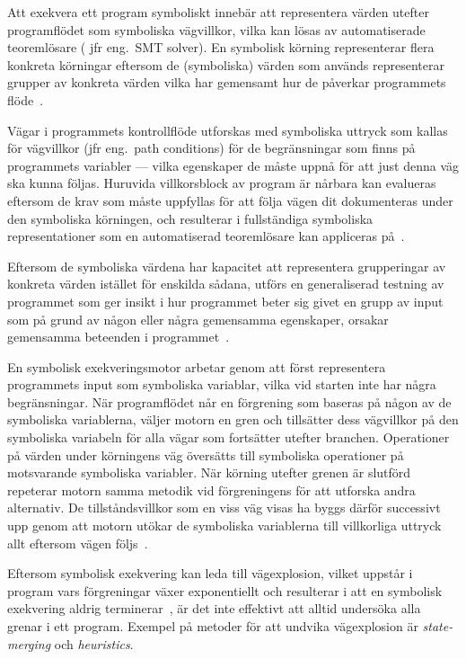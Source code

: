 Att exekvera ett program symboliskt innebär att representera värden utefter
programflödet som symboliska vägvillkor, vilka kan
lösas av automatiserade teoremlösare ( jfr eng.\ SMT solver). En symbolisk körning
representerar flera konkreta körningar eftersom de (symboliska) värden som
används representerar grupper av konkreta värden vilka har gemensamt hur de
påverkar programmets flöde~\cite{klee}.

Vägar i programmets kontrollflöde utforskas med symboliska uttryck som kallas
för vägvillkor (jfr eng.\ path conditions) för de begränsningar som finns på
programmets variabler --- vilka egenskaper de måste uppnå för att just denna väg
ska kunna följas. Huruvida villkorsblock av program är nårbara kan
evalueras eftersom de krav som måste uppfyllas för att följa vägen dit dokumenteras
under den symboliska körningen, och resulterar i fullständiga symboliska representationer
som en automatiserad teoremlösare kan appliceras på~\cite{klee}.

Eftersom de symboliska värdena har kapacitet att representera grupperingar av konkreta
värden istället för enskilda sådana, utförs en generaliserad testning av programmet
som ger insikt i hur programmet beter sig givet en grupp av input som
på grund av någon eller några gemensamma egenskaper, orsakar gemensamma beteenden
i programmet~\cite{Cadar}.

En symbolisk exekveringsmotor arbetar genom att först representera programmets
input som symboliska variablar, vilka vid starten inte har några begränsningar.
När programflödet når en förgrening som baseras på någon av de symboliska
variablerna, väljer motorn en gren och tillsätter dess vägvillkor på den
symboliska variabeln för alla vägar som fortsätter utefter branchen. Operationer
på värden under körningens väg översätts till symboliska operationer på
motsvarande symboliska variabler. När körning utefter grenen är
slutförd repeterar motorn samma metodik vid förgreningens för att utforska andra
alternativ. De tillståndsvillkor som en viss väg visas ha byggs därför
successivt upp genom att motorn utökar de symboliska variablerna till
villkorliga uttryck allt eftersom vägen följs~\cite{klee}.

Eftersom symbolisk exekvering kan leda till vägexplosion, vilket
uppstår i program vars förgreningar växer exponentiellt och resulterar i att en
symbolisk exekvering aldrig terminerar~\cite{path_explo}, är det inte effektivt
att alltid undersöka alla grenar i ett program. Exempel på metoder för att
undvika vägexplosion är \emph{state-merging} och \emph{heuristics}.

